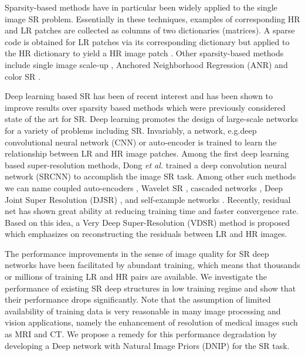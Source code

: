 \documentclass[9pt]{article}
\begin{document}
Sparsity-based methods have in particular been widely applied to the single image SR problem. Essentially in these techniques, examples of corresponding HR and LR patches are collected as columns of two dictionaries (matrices). A sparse code is obtained for LR patches via its corresponding dictionary but applied to the HR dictionary to yield a HR image patch \cite{YangAndWright:SparseSR_TIP2010}. Other sparsity-based methods include  single image scale-up \cite{Zeyde:SR_Springer2012}, Anchored Neighborhood Regression (ANR) \cite{Timofte:AnchoredANR_ICCV2013, Timofte:AnchoredARN+_ACCV2014} and color SR \cite{mousavi2017ColorSR_TIP}.


Deep learning based SR has been of recent interest and has been shown to improve results over sparsity based methods which were previously considered state of the art for SR. Deep learning promotes the design of large-scale networks \cite{hinton2006fast,bengio2007greedy,poultney2006efficient} for a variety of problems including SR. Invariably, a network, e.g.\a deep convolutional neural network (CNN) or auto-encoder is trained to learn the relationship between LR and HR image patches.
Among the first deep learning based super-resolution methods, Dong \emph{et al.} \cite{dong2014learning} trained a deep convolution neural network (SRCNN) to accomplish the image SR task. %
Among other such methods we can name coupled auto-encoders \cite{tiantong16deep}, Wavelet SR \cite{guo2017DWSR_CVPR}, cascaded networks  \cite{cui2014deep},  Deep Joint Super Resolution (DJSR)  \cite{wang2015self}, and self-example networks \cite{huang2015single}.
Recently, residual net \cite{he2016deep} has shown great ability at reducing training time and faster convergence rate. Based on this idea, a Very Deep Super-Resolution (VDSR) \cite{Kim_2016_VDSR} method is proposed which emphasizes on reconstructing the residuals between LR and HR images.

 The performance improvements in the sense of image quality for SR deep networks have been facilitated by abundant training, which means that thousands or millions of training LR and HR pairs are available. We investigate the performance of existing SR deep structures in low training regime and show that their performance drops significantly.  Note that the assumption of limited availability of training data is very reasonable in many image processing and vision applications, namely the enhancement of resolution of medical images such as MRI and CT. We propose a remedy for this performance degradation by developing a Deep network with Natural Image Priors (DNIP) for the SR task.
\end{document}
